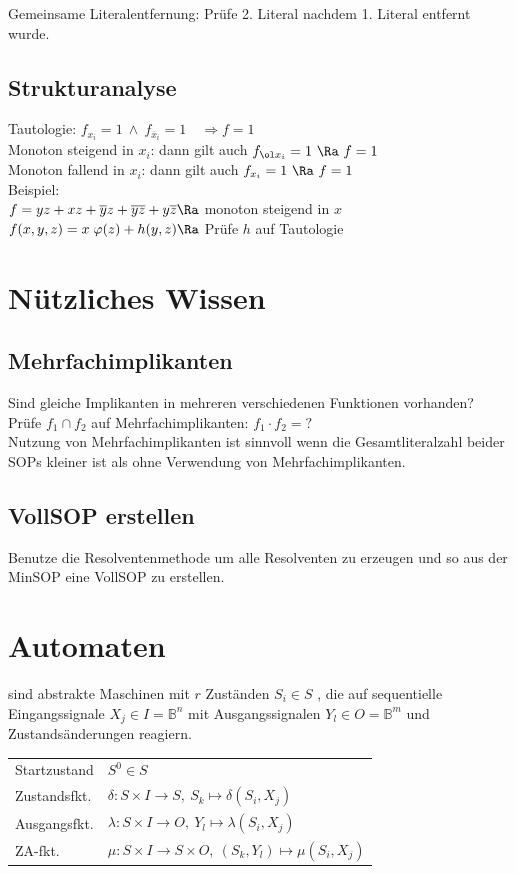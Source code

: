 \documentclass[6pt,a4paper]{scrartcl}
\newcommand{\n}[0]{\ensuremath{\overline}}										%
\begin{document}
\begin{multicols}{3}
Gemeinsame Literalentfernung: Prüfe 2. Literal nachdem 1. Literal entfernt wurde.\\

\subsection{Strukturanalyse}
Tautologie: $f_{x_i} = 1 \ \land \ f_{\overline x_i} = 1 \quad \Rightarrow f=1$\\
Monoton steigend in $x_i$:  dann gilt auch $f_{\ol x_i} = 1 \ \Ra\ f = 1$\\
Monoton fallend in $x_i$:  dann gilt auch $f_{x_i} = 1 \ \Ra\ f = 1$\\
Beispiel: \\
$f = yz + xz + \n y z + \n y \n z + y \n z \Ra$ monoton steigend in $x$ \\
$f(x,y,z) = x \; \varphi (z) + h(y,z) \Ra $ Prüfe $h$ auf Tautologie

\section{Nützliches Wissen}
\subsection{Mehrfachimplikanten}
Sind gleiche Implikanten in mehreren verschiedenen Funktionen vorhanden? \\ 
Prüfe  $f_1 \cap f_2 $ auf Mehrfachimplikanten: $f_1 \cdot f_2 = ?$ \\
Nutzung von Mehrfachimplikanten ist sinnvoll wenn die Gesamtliteralzahl beider SOPs kleiner ist als ohne Verwendung von Mehrfachimplikanten.

\subsection{VollSOP erstellen} %
\label{sub:VollSOP erstellen}
Benutze die Resolventenmethode um alle Resolventen zu erzeugen und so aus der MinSOP eine VollSOP zu erstellen.

\section{Automaten}
sind abstrakte Maschinen mit $r$ Zuständen $S_i \in S$ , die auf sequentielle Eingangssignale $X_j \in I = \mathbb B^n$ mit Ausgangssignalen $Y_l\in O = \mathbb B^m$ und Zustandsänderungen reagiern.\\
\begin{tabular}{ll}
	Startzustand & $S^0 \in S$ \\
	Zustandsfkt. & $\delta : S \times I \rightarrow S,\ S_k \mapsto \delta(S_i , X_j)$ \\
	Ausgangsfkt. & $\lambda : S \times I \rightarrow O,\ Y_l \mapsto \lambda(S_i , X_j)$ \\
	ZA-fkt. & $\mu : S \times I \rightarrow S \times O,\ (S_k, Y_l) \mapsto \mu(S_i , X_j)$ \\
\end{tabular}\\
\\

\end{multicols}
\end{document}
